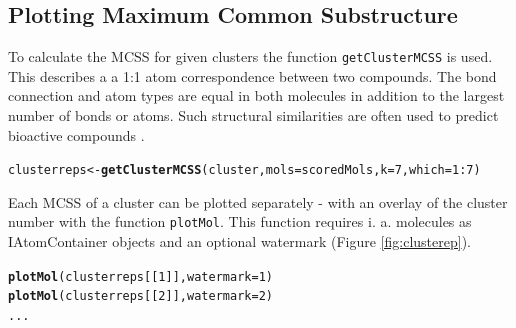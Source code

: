 \documentclass[12pt, a4paper]{scrartcl}\usepackage[]{graphicx}\usepackage[]{color}
\makeatletter
\newcommand{\hlnum}[1]{\textcolor[rgb]{0.686,0.059,0.569}{#1}}%
\newcommand{\hlopt}[1]{\textcolor[rgb]{0,0,0}{#1}}%
\newcommand{\hlstd}[1]{\textcolor[rgb]{0.345,0.345,0.345}{#1}}%
\newcommand{\hlkwb}[1]{\textcolor[rgb]{0.69,0.353,0.396}{#1}}%
\newcommand{\hlkwc}[1]{\textcolor[rgb]{0.333,0.667,0.333}{#1}}%
\newcommand{\hlkwd}[1]{\textcolor[rgb]{0.737,0.353,0.396}{\textbf{#1}}}%
\newenvironment{kframe}{%
 \def\at@end@of@kframe{}%
 \ifinner\ifhmode%
  \def\at@end@of@kframe{\end{minipage}}%
  \begin{minipage}{\columnwidth}%
 \fi\fi%
 \def\FrameCommand##1{\hskip\@totalleftmargin \hskip-\fboxsep
 \colorbox{shadecolor}{##1}\hskip-\fboxsep
     \hskip-\linewidth \hskip-\@totalleftmargin \hskip\columnwidth}%
 \MakeFramed {\advance\hsize-\width
   \@totalleftmargin\z@ \linewidth\hsize
   \@setminipage}}%
 {\par\unskip\endMakeFramed%
 \at@end@of@kframe}
\newenvironment{knitrout}{}{} %
\newcommand{\Rfunction}[1]{{\texttt{#1}}}
\makeatother
\begin{document}
\newpage
\subsection{Plotting Maximum Common Substructure}
To calculate the MCSS for given clusters the function \Rfunction{getClusterMCSS} is used. This describes a 
a 1:1 atom correspondence between two compounds. The bond connection and atom types are equal
in both molecules in addition to the largest number of bonds or atoms. Such structural similarities
are often used to predict bioactive compounds \cite{Cao2008}.


\begin{knitrout}
\color{fgcolor}\begin{kframe}
\begin{alltt}
  \hlstd{clusterreps} \hlkwb{<-} \hlkwd{getClusterMCSS}\hlstd{(cluster,} \hlkwc{mols}\hlstd{=scoredMols,} \hlkwc{k}\hlstd{=}\hlnum{7}\hlstd{,} \hlkwc{which}\hlstd{=}\hlnum{1}\hlopt{:}\hlnum{7}\hlstd{)}
\end{alltt}
\end{kframe}
\end{knitrout}

Each MCSS of a cluster can be plotted separately - with an overlay of the 
cluster number with the function \Rfunction{plotMol}. This function requires i. a. molecules as IAtomContainer 
objects and an optional watermark (Figure \ref{fig:clusterep}). 
\begin{knitrout}
\color{fgcolor}\begin{kframe}
\begin{alltt}
  \hlkwd{plotMol}\hlstd{(clusterreps[[}\hlnum{1}\hlstd{]],} \hlkwc{watermark}\hlstd{=}\hlnum{1}\hlstd{)}
  \hlkwd{plotMol}\hlstd{(clusterreps[[}\hlnum{2}\hlstd{]],} \hlkwc{watermark}\hlstd{=}\hlnum{2}\hlstd{)}
  \hlstd{...}
\end{alltt}
\end{kframe}
\end{knitrout}
\end{document}
